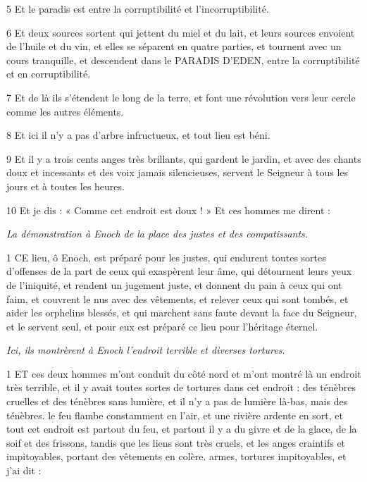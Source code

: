 \par 5 Et le paradis est entre la corruptibilité et l'incorruptibilité.

\par 6 Et deux sources sortent qui jettent du miel et du lait, et leurs sources envoient de l'huile et du vin, et elles se séparent en quatre parties, et tournent avec un cours tranquille, et descendent dans le PARADIS D'EDEN, entre la corruptibilité et en corruptibilité.

\par 7 Et de là ils s'étendent le long de la terre, et font une révolution vers leur cercle comme les autres éléments.

\par 8 Et ici il n'y a pas d'arbre infructueux, et tout lieu est béni.

\par 9 Et il y a trois cents anges très brillants, qui gardent le jardin, et avec des chants doux et incessants et des voix jamais silencieuses, servent le Seigneur à tous les jours et à toutes les heures.

\par 10 Et je dis : « Comme cet endroit est doux ! » Et ces hommes me dirent :


\par \textit{La démonstration à Enoch de la place des justes et des compatissants.}

\par 1 CE lieu, ô Enoch, est préparé pour les justes, qui endurent toutes sortes d'offenses de la part de ceux qui exaspèrent leur âme, qui détournent leurs yeux de l'iniquité, et rendent un jugement juste, et donnent du pain à ceux qui ont faim, et couvrent le nus avec des vêtements, et relever ceux qui sont tombés, et aider les orphelins blessés, et qui marchent sans faute devant la face du Seigneur, et le servent seul, et pour eux est préparé ce lieu pour l'héritage éternel.


\par \textit{Ici, ils montrèrent à Enoch l'endroit terrible et diverses tortures.}

\par 1 ET ces deux hommes m'ont conduit du côté nord et m'ont montré là un endroit très terrible, et il y avait toutes sortes de tortures dans cet endroit : des ténèbres cruelles et des ténèbres sans lumière, et il n'y a pas de lumière là-bas, mais des ténèbres. le feu flambe constamment en l'air, et une rivière ardente en sort, et tout cet endroit est partout du feu, et partout il y a du givre et de la glace, de la soif et des frissons, tandis que les liens sont très cruels, et les anges craintifs et impitoyables, portant des vêtements en colère. armes, tortures impitoyables, et j'ai dit :


